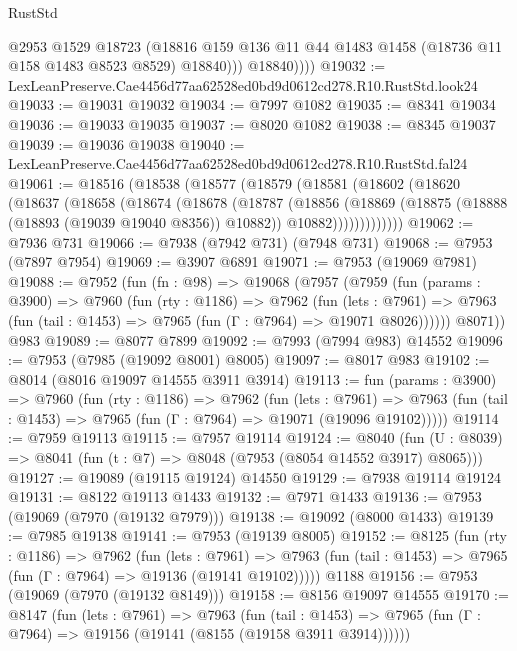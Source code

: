 \begin{lexlean}{RustStd}
\begin{coremodule}
                @2953
                @1529
                @18723
                (@18816 @159 @136 @11 @44 @1483 @1458 (@18736 @11 @158 @1483 @8523 @8529) @18840)))
            @18840))))
@19032 := LexLeanPreserve.Cae4456d77aa62528ed0bd9d0612cd278.R10.RustStd.look24
@19033 := @19031 @19032
@19034 := @7997 @1082
@19035 := @8341 @19034
@19036 := @19033 @19035
@19037 := @8020 @1082
@19038 := @8345 @19037
@19039 := @19036 @19038
@19040 := LexLeanPreserve.Cae4456d77aa62528ed0bd9d0612cd278.R10.RustStd.fal24
@19061 := @18516
    (@18538
      (@18577
        (@18579
          (@18581
            (@18602
              (@18620
                (@18637
                  (@18658
                    (@18674
                      (@18678
                        (@18787
                          (@18856
                            (@18869
                              (@18875 (@18888 (@18893 (@19039 @19040 @8356)) @10882))
                              @10882)))))))))))))
@19062 := @7936 @731
@19066 := @7938 (@7942 @731) (@7948 @731)
@19068 := @7953 (@7897 @7954)
@19069 := @3907 @6891
@19071 := @7953 (@19069 @7981)
@19088 := @7952
    (fun (fn : @98) =>
    @19068
      (@7957
        (@7959
          (fun (params : @3900) =>
          @7960
            (fun (rty : @1186) =>
            @7962
              (fun (lets : @7961) =>
              @7963 (fun (tail : @1453) => @7965 (fun (Γ : @7964) => @19071 @8026))))))
        @8071))
    @983
@19089 := @8077 @7899
@19092 := @7993 (@7994 @983) @14552
@19096 := @7953 (@7985 (@19092 @8001) @8005)
@19097 := @8017 @983
@19102 := @8014 (@8016 @19097 @14555 @3911 @3914)
@19113 := fun (params : @3900) =>
  @7960
    (fun (rty : @1186) =>
    @7962
      (fun (lets : @7961) =>
      @7963 (fun (tail : @1453) => @7965 (fun (Γ : @7964) => @19071 (@19096 @19102)))))
@19114 := @7959 @19113
@19115 := @7957 @19114
@19124 := @8040
    (fun (U : @8039) => @8041 (fun (t : @7) => @8048 (@7953 (@8054 @14552 @3917) @8065)))
@19127 := @19089 (@19115 @19124) @14550
@19129 := @7938 @19114 @19124
@19131 := @8122 @19113 @1433
@19132 := @7971 @1433
@19136 := @7953 (@19069 (@7970 (@19132 @7979)))
@19138 := @19092 (@8000 @1433)
@19139 := @7985 @19138
@19141 := @7953 (@19139 @8005)
@19152 := @8125
    (fun (rty : @1186) =>
    @7962
      (fun (lets : @7961) =>
      @7963 (fun (tail : @1453) => @7965 (fun (Γ : @7964) => @19136 (@19141 @19102)))))
    @1188
@19156 := @7953 (@19069 (@7970 (@19132 @8149)))
@19158 := @8156 @19097 @14555
@19170 := @8147
    (fun (lets : @7961) =>
    @7963
      (fun (tail : @1453) =>
      @7965 (fun (Γ : @7964) => @19156 (@19141 (@8155 (@19158 @3911 @3914))))))

\end{coremodule}
\end{lexlean}

